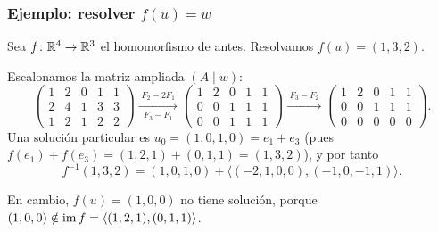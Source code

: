 \begin{frame}
    \frametitle{Ejemplo: resolver $f(u)=w$}

    \begin{example}
        Sea $f\colon\mathbb{R}^4\to\mathbb{R}^3$ el homomorfismo de antes. Resolvamos
        $f(u)=(1,3,2)$.
    \end{example}

    Escalonamos la matriz ampliada $(A\mid w)$:
    \[
        \left(\begin{array}{cccc|c}
            1&2&0&1&1\\2&4&1&3&3\\1&2&1&2&2
        \end{array}\right)
        \xrightarrow[\;F_3-F_1\;]{\;F_2-2F_1\;}
        \left(\begin{array}{cccc|c}
            1&2&0&1&1\\0&0&1&1&1\\0&0&1&1&1
        \end{array}\right)
        \xrightarrow{\;F_3-F_2\;}
        \left(\begin{array}{cccc|c}
            1&2&0&1&1\\0&0&1&1&1\\0&0&0&0&0
        \end{array}\right).
    \]
    Una solución particular es $u_0=(1,0,1,0)=e_1+e_3$ (pues
    $f(e_1)+f(e_3)=(1,2,1)+(0,1,1)=(1,3,2)$), y por tanto
    \[
        f^{-1}(1,3,2)=(1,0,1,0)+\langle(-2,1,0,0),(-1,0,-1,1)\rangle.
    \]

    \medskip

    En cambio, $f(u)=(1,0,0)$ no tiene solución, porque
    $(1,0,0)\notin\operatorname{im} f=\langle(1,2,1),(0,1,1)\rangle$.
\end{frame}



